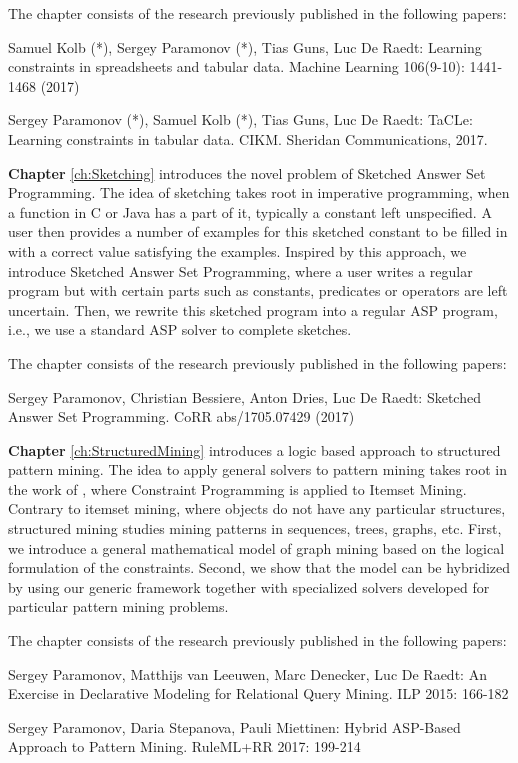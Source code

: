 The chapter consists of the research previously published in the following papers:

\begin{addmargin}[2em]{2em}
Samuel Kolb (*), Sergey Paramonov (*), Tias Guns, Luc De Raedt:
  Learning constraints in spreadsheets and tabular data. Machine
  Learning 106(9-10): 1441-1468 (2017)


Sergey Paramonov (*), Samuel Kolb (*), Tias Guns, Luc De Raedt:
TaCLe: Learning constraints in tabular data. CIKM. Sheridan
Communications, 2017.
\end{addmargin}


\textbf{Chapter} \ref{ch:Sketching} introduces the novel problem of
Sketched Answer Set Programming. The idea of sketching takes root in
imperative programming, when a function in C or Java has a part of it,
typically a constant left unspecified. A user then provides a number
of examples for this sketched constant to be filled in with a
correct value satisfying the examples. Inspired by this approach, we
introduce Sketched Answer Set Programming, where a user writes a
regular program but with certain parts such as constants, predicates
or operators are left uncertain. Then, we rewrite this sketched
program into a regular ASP program, i.e., we use a standard ASP solver
to complete sketches.


The chapter consists of the research previously published in the following papers:
\begin{addmargin}[2em]{2em}
  Sergey Paramonov, Christian Bessiere, Anton Dries, Luc De Raedt:
  Sketched Answer Set Programming. CoRR abs/1705.07429 (2017)
\end{addmargin}


\textbf{Chapter} \ref{ch:StructuredMining} introduces a logic
based approach to structured pattern mining. The idea to apply general
solvers to pattern mining takes root in the work of
\cite{declrativeapproach}, where Constraint Programming is applied to
Itemset Mining. Contrary to itemset mining, where objects do not have
any particular structures, structured mining studies mining patterns
in sequences, trees, graphs, etc. First, we introduce a general
mathematical model of graph mining based on the logical formulation of
the constraints. Second, we show that the model can be hybridized by
using our generic framework together with specialized solvers
developed for particular pattern mining problems.

The chapter consists of the research previously published in the following papers:
\begin{addmargin}[2em]{2em}
Sergey Paramonov, Matthijs van Leeuwen, Marc Denecker, Luc De Raedt:
An Exercise in Declarative Modeling for Relational Query Mining. ILP
2015: 166-182


Sergey Paramonov, Daria Stepanova, Pauli Miettinen:
Hybrid ASP-Based Approach to Pattern Mining. RuleML+RR 2017: 199-214
\end{addmargin}


